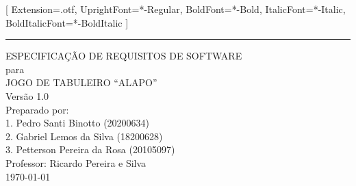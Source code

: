 \documentclass{scrreprt}
\date{\today}
\def\myversion{1.0}
\begin{document}
  \setmainfont{STIXTwoText}[
    Extension={.otf},
    UprightFont={*-Regular},
    BoldFont={*-Bold},
    ItalicFont={*-Italic},
    BoldItalicFont={*-BoldItalic}
  ]

  \begin{flushright}
      \rule{16cm}{5pt}\vskip1cm
      \begin{bfseries}
          \Huge{ESPECIFICAÇÃO DE REQUISITOS DE SOFTWARE}\\
          \vspace{1.0cm}
          para\\
          \vspace{1.0cm}
          JOGO DE TABULEIRO ``ALAPO''\\
          \vspace{1.0cm}
          \LARGE{Versão \myversion}\\
          \vspace{1.0cm}
          Preparado por: \\ 
          1. Pedro Santi Binotto (20200634)\\
          2. Gabriel Lemos da Silva (18200628)\\
          3. Petterson Pereira da Rosa (20105097)\\
          \vspace{1.0cm}
          Professor: Ricardo Pereira e Silva\\
          \vspace{1.0cm}
          \today\\
      \end{bfseries}
  \end{flushright}

  \tableofcontents

  \clearpage

  \printglossary[title=Lista de Definições, toctitle=Lista de Definições]

  
  
  

  
  
\end{document}

